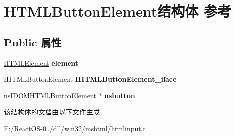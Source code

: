 \hypertarget{struct_h_t_m_l_button_element}{}\section{H\+T\+M\+L\+Button\+Element结构体 参考}
\label{struct_h_t_m_l_button_element}
\subsection*{Public 属性}
\begin{DoxyCompactItemize}
\item 
\mbox{\label{struct_h_t_m_l_button_element_a4729835ae89b935d1aaef5f6deb73060}} 
\hyperlink{struct_h_t_m_l_element}{H\+T\+M\+L\+Element} {\bfseries element}
\item 
\mbox{\label{struct_h_t_m_l_button_element_a1aecb60e9ce59d088f37514e5bc184be}} 
I\+H\+T\+M\+L\+Button\+Element {\bfseries I\+H\+T\+M\+L\+Button\+Element\+\_\+iface}
\item 
\mbox{\label{struct_h_t_m_l_button_element_a2b063f441b391ef6fb64acde58e480d5}} 
\hyperlink{interfacens_i_d_o_m_h_t_m_l_button_element}{ns\+I\+D\+O\+M\+H\+T\+M\+L\+Button\+Element} $\ast$ {\bfseries nsbutton}
\end{DoxyCompactItemize}


该结构体的文档由以下文件生成\+:\begin{DoxyCompactItemize}
\item 
E\+:/\+React\+O\+S-\/0../dll/win32/mshtml/htmlinput.\+c\end{DoxyCompactItemize}
